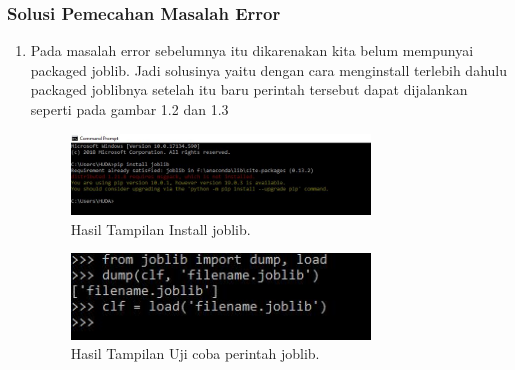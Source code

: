 \subsubsection{Solusi Pemecahan Masalah Error}
\begin{enumerate}
\item Pada masalah error sebelumnya itu dikarenakan kita belum mempunyai packaged joblib. Jadi solusinya yaitu dengan cara menginstall terlebih dahulu packaged joblibnya setelah itu baru perintah tersebut dapat dijalankan seperti pada gambar 1.2 dan 1.3
\begin{figure}[ht]\centerline{\includegraphics[width=0.75\textwidth]{figures/huda/33.JPG}}\caption{Hasil Tampilan Install joblib.}\end{figure}
\begin{figure}[ht]\centerline{\includegraphics[width=0.75\textwidth]{figures/huda/32.JPG}}\caption{Hasil Tampilan Uji coba perintah joblib.}\end{figure}
\end{enumerate}

